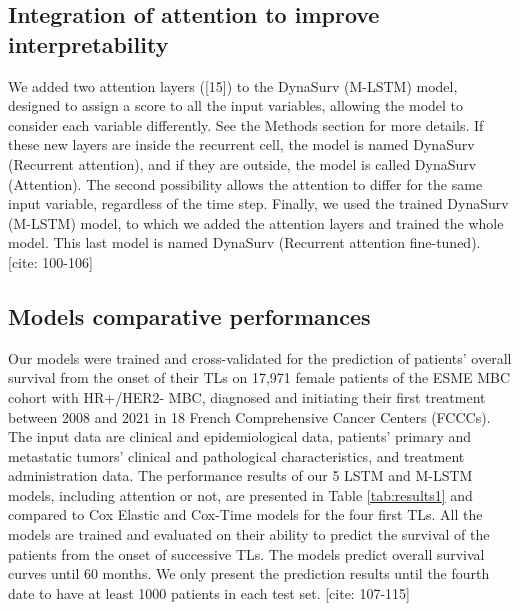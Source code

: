 \documentclass[a4paper,10pt]{article}
\begin{document}
\subsection{Integration of attention to improve interpretability}
We added two attention layers ([15]) to the DynaSurv (M-LSTM) model, designed to assign a score to all the input variables, allowing the model to consider each variable differently. See the Methods section for more details. If these new layers are inside the recurrent cell, the model is named DynaSurv (Recurrent attention), and if they are outside, the model is called DynaSurv (Attention). The second possibility allows the attention to differ for the same input variable, regardless of the time step. Finally, we used the trained DynaSurv (M-LSTM) model, to which we added the attention layers and trained the whole model. This last model is named DynaSurv (Recurrent attention fine-tuned). [cite: 100-106]

\subsection{Models comparative performances}
Our models were trained and cross-validated for the prediction of patients' overall survival from the onset of their TLs on 17,971 female patients of the ESME MBC cohort with HR+/HER2- MBC, diagnosed and initiating their first treatment between 2008 and 2021 in 18 French Comprehensive Cancer Centers (FCCCs). The input data are clinical and epidemiological data, patients' primary and metastatic tumors' clinical and pathological characteristics, and treatment administration data. The performance results of our 5 LSTM and M-LSTM models, including attention or not, are presented in Table \ref{tab:results1} and compared to Cox Elastic and Cox-Time models for the four first TLs. All the models are trained and evaluated on their ability to predict the survival of the patients from the onset of successive TLs. The models predict overall survival curves until 60 months. We only present the prediction results until the fourth date to have at least 1000 patients in each test set. [cite: 107-115]
\end{document}
